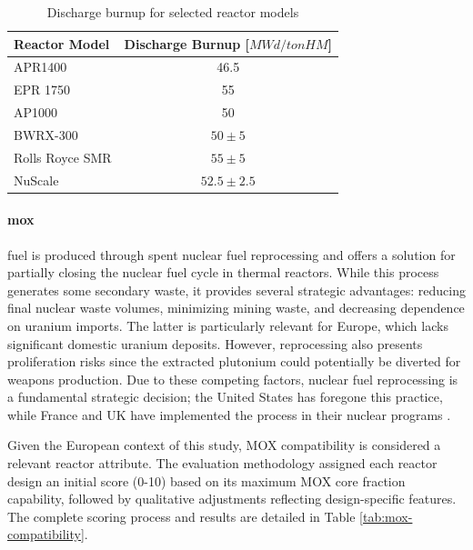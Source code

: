 \begin{table}[!ht]
    \centering
    \begin{tabularx}{\textwidth}{X c}
        \toprule
        \textbf{Reactor Model} & \textbf{Discharge Burnup [$MWd/tonHM$]} \\
        \midrule
        APR1400         & 46.5 \\
        EPR 1750        & 55 \\
        AP1000          & 50 \\
        BWRX-300        & $50 \pm 5$ \\
        Rolls Royce SMR & $55 \pm 5$ \\
        NuScale         & $52.5 \pm 2.5$ \\
        \bottomrule
    \end{tabularx}
    \caption{Discharge burnup for selected reactor models}
    \label{tab:reactor-burnup}
\end{table}



\paragraph{\gls{mox}} fuel is produced through spent nuclear fuel reprocessing and offers a solution for partially closing the nuclear fuel cycle in thermal reactors. While this process generates some secondary waste, it provides several strategic advantages: reducing final nuclear waste volumes, minimizing mining waste, and decreasing dependence on uranium imports. The latter is particularly relevant for Europe, which lacks significant domestic uranium deposits. However, reprocessing also presents proliferation risks since the extracted plutonium could potentially be diverted for weapons production. Due to these competing factors, nuclear fuel reprocessing is a fundamental strategic decision; the United States has foregone this practice, while France and UK have implemented the process in their nuclear programs \cite{CRS_Reprocessing_Spent_Fuel_2025}.

Given the European context of this study, MOX compatibility is considered a relevant reactor attribute. The evaluation methodology assigned each reactor design an initial score (0-10) based on its maximum MOX core fraction capability, followed by qualitative adjustments reflecting design-specific features. The complete scoring process and results are detailed in Table \ref{tab:mox-compatibility}.

